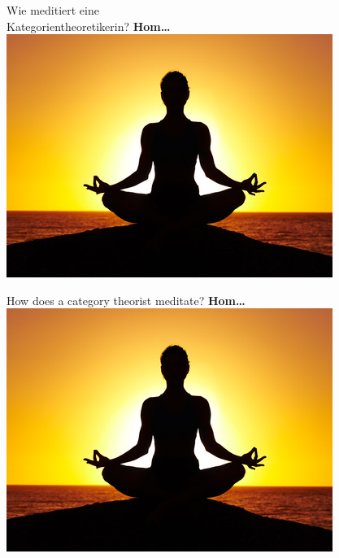 \documentclass[a4paper,ngerman,landscape,30pt]{scrartcl}
\begin{document}
\begin{center}
  \Huge\sffamily
  Wie meditiert eine \\ Kategorientheoretikerin?
  \textbf{\phantom{\ldots}Hom\ldots}
  \vfill
  \includegraphics[scale=0.7]{images/meditation}
\end{center}
\newpage

\begin{center}
  \Huge\sffamily
  How does a category theorist meditate?
  \textbf{\phantom{\ldots}Hom\ldots}
  \vfill
  \includegraphics[scale=0.7]{images/meditation}
\end{center}
\newpage

\end{document}
